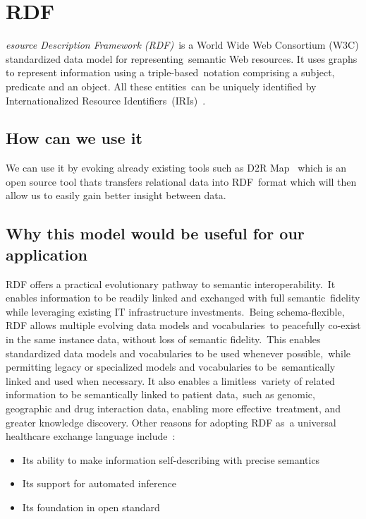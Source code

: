   \section[Resource Description Framework (RDF)]{RDF}
  \label{sec:rdf}

  \textit{esource Description Framework (RDF)}\
  is a World Wide Web Consortium (W3C) standardized data model for representing\
  semantic Web resources. It uses graphs to represent information using a triple-based\
  notation comprising a subject, predicate and an object. All these entities\
  can be uniquely identified by Internationalized Resource Identifiers\
  (IRIs)~\citep{pathak_applying_2012}.

  \subsection{How can we use it}

  We can use it by evoking already existing tools such as D2R Map \citep{_d2r_tool_2013}\
  which is an open source tool thats transfers relational data into RDF\
  format which will then allow us to easily gain better insight between data.\

  \subsection{Why this model would be useful for our application}

  RDF offers a practical evolutionary pathway to semantic interoperability.\
  It enables information to be readily linked and exchanged with full semantic\
  fidelity while leveraging existing IT infrastructure investments.\
  Being schema-flexible, RDF allows multiple evolving data models and vocabularies\
  to peacefully co-exist in the same instance data, without loss of semantic fidelity.\
  This enables standardized data models and vocabularies to be used whenever possible,\ 
  while permitting legacy or specialized models and vocabularies to be\
  semantically linked and used when necessary. It also enables a limitless\
  variety of related information to be semantically linked to patient data,\
  such as genomic, geographic and drug interaction data, enabling more effective\
  treatment, and greater knowledge discovery. Other reasons for adopting RDF as\
  a universal healthcare exchange language include~\citep{_Munnecke_2013}:
  \begin{itemize}
    \itemsep0ex
    \item Its ability to make information self-describing with precise semantics
    \item Its support for automated inference
    \item Its foundation in open standard
  \end{itemize}

